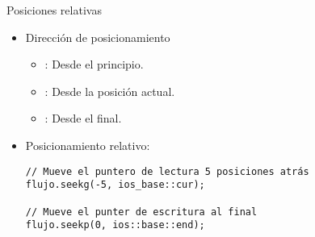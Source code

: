 \begin{frame}[t,fragile]{Posiciones relativas}
\begin{itemize}
  \item Dirección de posicionamiento
    \begin{itemize}
      \item {}: Desde el principio.
      \item {}: Desde la posición actual.
      \item {}: Desde el final.
    \end{itemize}
  \item Posicionamiento relativo:
\begin{lstlisting}
// Mueve el puntero de lectura 5 posiciones atrás 
flujo.seekg(-5, ios_base::cur);

// Mueve el punter de escritura al final
flujo.seekp(0, ios::base::end); 
\end{lstlisting}
\end{itemize}
\end{frame}
